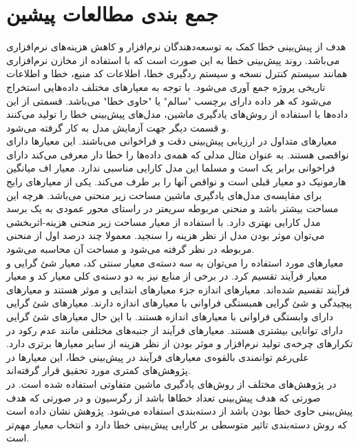 \section{جمع بندی مطالعات پیشین}
\label{sec:conclustion}
هدف از پیش‌بینی خطا کمک به توسعه‌دهندگان نرم‌افزار و کاهش هزینه‌های نرم‌افزاری می‌باشد. روند پیش‌بینی خطا به این صورت است که با استفاده از مخازن نرم‌افزاری همانند سیستم کنترل نسخه و سیستم ردگیری خطا، اطلاعات کد منبع، خطا و اطلاعات تاریخی پروژه جمع آوری می‌شود. با توجه به معیارهای مختلف داده‌هایی استخراج می‌شود که هر داده دارای برچسب "سالم" یا "حاوی خطا" می‌باشد. قسمتی از این داده‌ها با استفاده از روش‌های یادگیری ماشین، مدل‌های پیش‌بینی خطا را تولید می‌کنند و قسمت دیگر جهت آزمایش مدل به کار گرفته می‌شود.\\

معیارهای متداول در ارزیابی پیش‌بینی دقت و فراخوانی می‌باشند. این معیارها دارای نواقصی هستند. به عنوان مثال مدلی که همه‌ی داده‌ها را خطا دار معرفی می‌کند دارای فراخوانی  برابر یک است و مسلما این مدل کارایی مناسبی ندارد. معیار اف  میانگین هارمونیک دو معیار قبلی است و نواقص آنها را بر طرف می‌کند. یکی از معیار‌های رایج برای مقایسه‌ی مدل‌های یادگیری ماشین مساحت زیر منحنی می‌باشد. هرچه این مساحت بیشتر باشد و منحنی مربوطه سریعتر  در راستای محور عمودی  به یک برسد مدل کارایی بهتری دارد. با استفاده از معیار مساحت زیر منحنی هزینه-اثربخشی می‌توان موثر بودن مدل از نظر هزینه را سنجید. معمولا چند درصد اول از منحنی مربوطه در نظر گرفته می‌شود و مساحت آن محاسبه می‌شود. \\

معیارهای مورد استفاده را می‌توان به سه دسته‌ی معیار سنتی کد، معیار شئ گرایی و معیار فرآیند تقسیم کرد. در برخی از منابع نیز  به دو دسته‌ی کلی معیار کد و معیار فرآیند تقسیم شده‌اند. معیارهای اندازه جزء معیارهای ابتدایی و موثر هستند و معیارهای پیچیدگی و شئ گرایی همبستگی فراوانی با معیارهای اندازه دارند. معیارهای شئ گرایی دارای وابستگی فراوانی با معیار‌های اندازه هستند. با این حال معیارهای شئ گرایی دارای توانایی بیشتری هستند. معیارهای فرآیند از جنبه‌های مختلفی  مانند عدم رکود در تکرار‌های چرخه‌ی تولید نرم‌افزار و موثر بودن از نظر هزینه از سایر معیارها برتری دارد. علی‌رغم توانمندی بالقوه‌ی معیارهای فرآیند در پیش‌بینی خطا، این معیارها در پژوهش‌های کمتری مورد تحقیق قرار گرفته‌اند. \\

در پژوهش‌های مختلف از روش‌های یادگیری ماشین متفاوتی استفاده شده است. در صورتی که هدف پیش‌بینی تعداد خطاها باشد از رگرسیون و در صورتی که هدف پیش‌بینی حاوی خطا بودن باشد از دسته‌بندی استفاده می‌شود. پژوهش \cite{arisholm2010systematic}  نشان داده است که روش دسته‌بندی تاثیر متوسطی بر کارایی پیش‌بینی خطا دارد و انتخاب معیار مهم‌تر است. \\

